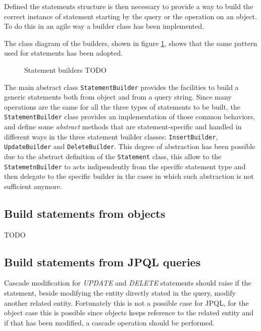 \newparagraph Defined the statements structure is then necessary to provide a way to build the correct instance of statement starting by the query or the operation on an object.
To do this in an agile way a builder class has been implemented.

\noindent The class diagram of the builders, shown in figure \ref{fig:builders}, shows that the same pattern used for statements has been adopted.

\begin{figure}[tbh]
  \centering
  \begin{minipage}[c][0.33\textheight][c]{0.5\textwidth}
  \end{minipage}
  \caption{Statement builders TODO}
  \label{fig:builders}
\end{figure} 

\noindent The main abstract class \texttt{StatementBuilder} provides the facilities to build a generic statements both from object and from a query string.
Since many operations are the same for all the three types of statements to be built, the \texttt{StatementBuilder} class provides an implementation of those common behaviors, and define some \textit{abstract} methods that are statement-specific and handled in different ways in the three statement builder classes: \texttt{InsertBuilder}, \texttt{UpdateBuilder} and \texttt{DeleteBuilder}.
This degree of abstraction has been possible due to the abstract definition of the \texttt{Statement} class, this allow to the \texttt{StatemetnBuilder} to acts indipendently from the specific statement type and then delegate to the specific builder in the cases in which such abstraction is not sufficient anymore.

\subsection{Build statements from objects}
TODO

\subsection{Build statements from JPQL queries}
Cascade modification for \textit{UPDATE} and \textit{DELETE} statements should raise if the statement, beside modifying the entity directly stated in the query, modify another related entity. Fortunately this is not a possible case for JPQL, for the object case this is possible since objects keeps reference to the related entity and if that has been modified, a cascade operation should be performed.
 
